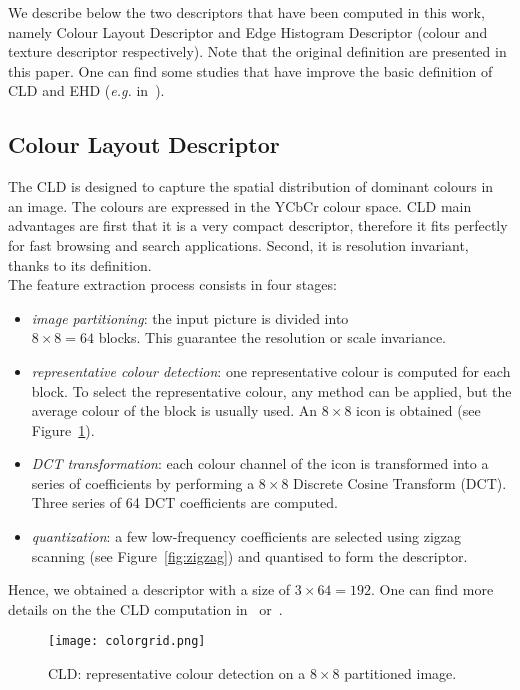 \documentclass[conference]{IEEEtran}
\begin{document}
We describe below the two descriptors that have been computed in this work, namely Colour Layout Descriptor and Edge Histogram Descriptor (colour and texture descriptor respectively). Note that the original definition are presented in this paper. One can find some studies that have improve the basic definition of CLD and EHD (\textit{e.g.} in~\cite{ehd:2002}).\\

\subsection{Colour Layout Descriptor}
\label{sec:cld}
The CLD is designed to capture the spatial distribution of dominant
colours in an image. The colours are expressed in the YCbCr colour space. CLD main advantages are first that it is a very compact descriptor, therefore it fits perfectly for fast browsing and search applications. Second, it is resolution invariant, thanks to its definition.\\

The feature extraction process consists in four stages:
\begin{itemize}
	\item \textit{image partitioning}: the input picture is divided into \\$8\times8=64$ blocks. This guarantee the resolution or scale invariance.
	\item \textit{representative colour detection}: one representative colour is computed for each block. To select the representative colour, any method can be applied, but 
the average colour of the block is usually used. An $8\times8$ icon is obtained (see Figure~\ref{fig:colorgrid}).
	\item \textit{DCT transformation}: each colour channel of the icon is transformed into a series of coefficients by performing a $8\times8$ Discrete Cosine Transform (DCT). Three series of 64 DCT coefficients are computed.
	\item \textit{quantization}: a few low-frequency coefficients are selected using zigzag scanning (see Figure~\ref{fig:zigzag}) and quantised to form the descriptor.\\
\end{itemize}

Hence, we obtained a descriptor with a size of $3\times64=192$. One can find more details on the the CLD computation in~\cite{Manjunath:2001} or~\cite{Manjunath:2002}.

\begin{figure}[!ht]
\center
	\texttt{[image: colorgrid.png]}
	\caption{CLD: representative colour detection on a $8\times8$ partitioned image.}
	\label{fig:colorgrid}
\end{figure}
\end{document}
